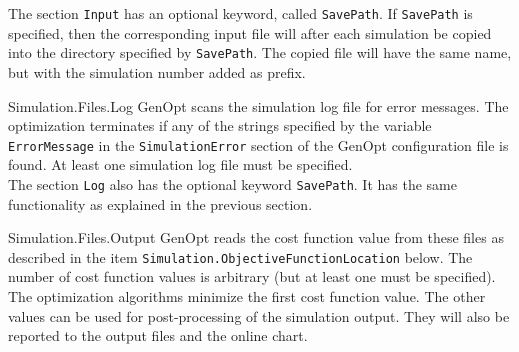 \begin{codedescription}
The section \verb$Input$ has an optional keyword, called \verb$SavePath$. If \verb$SavePath$ is specified, then the corresponding input file will after each simulation be copied into the directory specified by \verb$SavePath$. The copied file will have the same name, but with the simulation number added as prefix. 
\item [Simulation.Files.Log]
GenOpt scans the simulation log file for error messages.
The optimization terminates if any of the strings specified by the variable \verb$ErrorMessage$ in the \verb$SimulationError$ section of the GenOpt configuration file is found. 
At least one simulation log file must be specified.\\

The section \verb$Log$ also has the optional keyword \verb$SavePath$.
It has the same functionality as explained in the previous section.

\item[Simulation.Files.Output]
\label{ite:simFilOut}
GenOpt reads the cost function value from these files as described in 
the item {\tt Simulation.ObjectiveFunctionLocation} below.
The number of cost function values is arbitrary (but at least one must be specified). 
The optimization algorithms minimize the first cost function value.
The other values can be used for post-processing of the simulation output.
They will also be reported to the output files and the online chart.\\


\end{codedescription}
